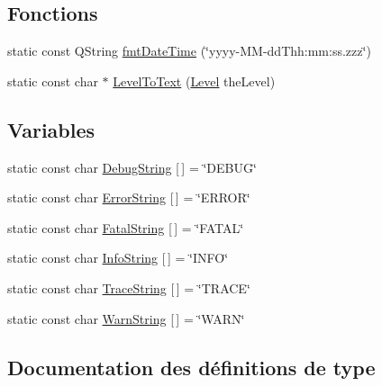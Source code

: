 \subsection*{Fonctions}
\begin{DoxyCompactItemize}
\item 
static const Q\-String \hyperlink{namespaceQsLogging_a9123c4017c6160e28fa489e419b23a9c}{fmt\-Date\-Time} (\char`\"{}yyyy-\/M\-M-\/dd\-Thh\-:mm\-:ss.\-zzz\char`\"{})
\item 
static const char $\ast$ \hyperlink{namespaceQsLogging_a8e669585768b47ba483f7325c18d60b8}{Level\-To\-Text} (\hyperlink{namespaceQsLogging_a38c7dd87e4de6f8eb460763ad0baa033}{Level} the\-Level)
\end{DoxyCompactItemize}
\subsection*{Variables}
\begin{DoxyCompactItemize}
\item 
static const char \hyperlink{namespaceQsLogging_a961ecb32f941957f4fb2ce0e244e1dc0}{Debug\-String} \mbox{[}$\,$\mbox{]} = \char`\"{}D\-E\-B\-U\-G\char`\"{}
\item 
static const char \hyperlink{namespaceQsLogging_a81932d0d90f858336dcae9ea81560f51}{Error\-String} \mbox{[}$\,$\mbox{]} = \char`\"{}E\-R\-R\-O\-R\char`\"{}
\item 
static const char \hyperlink{namespaceQsLogging_a6664814676313b529499e9590ed1c476}{Fatal\-String} \mbox{[}$\,$\mbox{]} = \char`\"{}F\-A\-T\-A\-L\char`\"{}
\item 
static const char \hyperlink{namespaceQsLogging_a747ad47c7ca8e96d020e912573d18cd1}{Info\-String} \mbox{[}$\,$\mbox{]} = \char`\"{}I\-N\-F\-O\char`\"{}
\item 
static const char \hyperlink{namespaceQsLogging_a8bb6a67c53ebaad64d3e58c5a5a362ee}{Trace\-String} \mbox{[}$\,$\mbox{]} = \char`\"{}T\-R\-A\-C\-E\char`\"{}
\item 
static const char \hyperlink{namespaceQsLogging_a448066a966f37903f05c519ceb33814f}{Warn\-String} \mbox{[}$\,$\mbox{]} = \char`\"{}W\-A\-R\-N\char`\"{}
\end{DoxyCompactItemize}


\subsection{Documentation des définitions de type}
\hypertarget{namespaceQsLogging_a566a41f076f9a05c94cb6980ec554e2c}{
\subsubsection[{Destination\-List}]{}}\label{namespaceQsLogging_a566a41f076f9a05c94cb6980ec554e2c}


